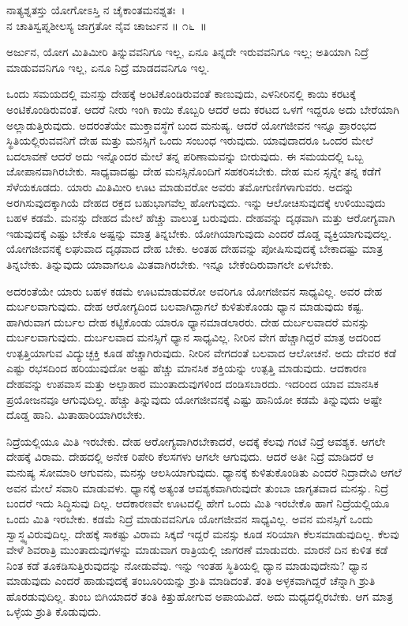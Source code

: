 \begin{shloka}
ನಾತ್ಯಶ್ನತಸ್ತು ಯೋಗೋಽಸ್ತಿ ನ ಚೈಕಾಂತಮನಶ್ನತಃ~।\\ನ ಚಾತಿಸ್ವಪ್ನಶೀಲಸ್ಯ ಜಾಗ್ರತೋ ನೈವ ಚಾರ್ಜುನ \hfill॥ ೧೬~॥
\end{shloka}

\begin{artha}
ಅರ್ಜುನ, ಯೋಗ ಮಿತಿಮೀರಿ ತಿನ್ನುವವನಿಗೂ ಇಲ್ಲ, ಏನೂ ತಿನ್ನದೇ ಇರುವವನಿಗೂ ಇಲ್ಲ; ಅತಿಯಾಗಿ ನಿದ್ರೆ ಮಾಡುವವನಿಗೂ ಇಲ್ಲ, ಏನೂ ನಿದ್ರೆ ಮಾಡದವನಿಗೂ ಇಲ್ಲ.
\end{artha}

ಒಂದು ಸಮಯದಲ್ಲಿ ಮನಸ್ಸು ದೇಹಕ್ಕೆ ಅಂಟಿಕೊಂಡಿರುವಂತೆ ಕಾಣುವುದು, ಎಳನೀರಿನಲ್ಲಿ ಕಾಯಿ ಕರಟಕ್ಕೆ ಅಂಟಿಕೊಂಡಿರುವಂತೆ. ಆದರೆ ನೀರು ಇಂಗಿ ಕಾಯಿ ಕೊಬ್ಬರಿ ಆದರೆ ಅದು ಕರಟದ ಒಳಗೆ ಇದ್ದರೂ ಅದು ಬೇರೆಯಾಗಿ ಅಲ್ಲಾಡುತ್ತಿರುವುದು. ಅದರಂತೆಯೇ ಮುಕ್ತಾವಸ್ಥೆಗೆ ಬಂದ ಮನುಷ್ಯ. ಆದರೆ ಯೋಗಜೀವನ ಇನ್ನೂ ಪ್ರಾರಂಭದ ಸ್ಥಿತಿಯಲ್ಲಿರುವವನಿಗೆ ದೇಹ ಮತ್ತು ಮನಸ್ಸಿಗೆ ಒಂದು ಸಂಬಂಧ ಇರುವುದು. ಯಾವುದಾದರೂ ಒಂದರ ಮೇಲೆ ಬದಲಾವಣೆ ಆದರೆ ಅದು ಇನ್ನೊಂದರ ಮೇಲೆ ತನ್ನ ಪರಿಣಾಮವನ್ನು ಬೀರುವುದು. ಈ ಸಮಯದಲ್ಲಿ ಒಬ್ಬ ಜೋಪಾನವಾಗಿರಬೇಕು. ಸಾಧ್ಯವಾದಷ್ಟು ದೇಹ ಮನಸ್ಸಿನೊಂದಿಗೆ ಸಹಕರಿಸಬೇಕು. ದೇಹ ಮನ ಸ್ಸನ್ನೇ ತನ್ನ ಕಡೆಗೆ ಸೆಳೆಯಕೂಡದು. ಯಾರು ಮಿತಿಮೀರಿ ಊಟ ಮಾಡುವರೋ ಅವರು ತಮೋಗುಣಿಗಳಾಗುವರು. ಅದನ್ನು ಅರಗಿಸುವುದಕ್ಕಾಗಿಯೆ ದೇಹದ ರಕ್ತದ ಬಹುಭಾಗವೆಲ್ಲ ಹೋಗುವುದು. ಇನ್ನು ಆಲೋಚಿಸುವುದಕ್ಕೆ ಉಳಿಯುವುದು ಬಹಳ ಕಡಮೆ. ಮನಸ್ಸು ದೇಹದ ಮೇಲೆ ಹೆಚ್ಚು ವಾಲುತ್ತ ಬರುವುದು. ದೇಹವನ್ನು ದೃಢವಾಗಿ ಮತ್ತು ಆರೋಗ್ಯವಾಗಿ ಇಡುವುದಕ್ಕೆ ಎಷ್ಟು ಬೇಕೊ ಅಷ್ಟನ್ನು ಮಾತ್ರ ತಿನ್ನಬೇಕು. ಯೋಗಿಯಾಗುವುದು ಎಂದರೆ ದೊಡ್ಡ ವ್ಯಕ್ತಿಯಾಗುವುದಲ್ಲ. ಯೋಗಜೀವನಕ್ಕೆ ಲಘುವಾದ ದೃಢವಾದ ದೇಹ ಬೇಕು. ಅಂತಹ ದೇಹವನ್ನು ಪೋಷಿಸುವುದಕ್ಕೆ ಬೇಕಾದಷ್ಟು ಮಾತ್ರ ತಿನ್ನಬೇಕು. ತಿನ್ನುವುದು ಯಾವಾಗಲೂ ಮಿತವಾಗಿರಬೇಕು. ಇನ್ನೂ ಬೇಕೆಂದಿರುವಾಗಲೇ ಏಳಬೇಕು.

ಅದರಂತೆಯೇ ಯಾರು ಬಹಳ ಕಡಮೆ ಊಟಮಾಡುವರೋ ಅವರಿಗೂ ಯೋಗಜೀವನ ಸಾಧ್ಯವಿಲ್ಲ. ಅವರ ದೇಹ ದುರ್ಬಲವಾಗುವುದು. ದೇಹ ಆರೋಗ್ಯದಿಂದ ಬಲವಾಗಿದ್ದಾಗಲೆ ಕುಳಿತುಕೊಂಡು ಧ್ಯಾನ ಮಾಡುವುದು ಕಷ್ಟ. ಹಾಗಿರುವಾಗ ದುರ್ಬಲ ದೇಹ ಕಟ್ಟಿಕೊಂಡು ಯಾರೂ ಧ್ಯಾನಮಾಡಲಾರರು. ದೇಹ ದುರ್ಬಲವಾದರೆ ಮನಸ್ಸು ದುರ್ಬಲವಾಗುವುದು. ದುರ್ಬಲವಾದ ಮನಸ್ಸಿಗೆ ಧ್ಯಾನ ಸಾಧ್ಯವಿಲ್ಲ. ನೀರಿನ ವೇಗ ಹೆಚ್ಚಾಗಿದ್ದರೆ ಮಾತ್ರ ಅದರಿಂದ ಉತ್ಪತ್ತಿಯಾಗುವ ವಿದ್ಯುಚ್ಛಕ್ತಿ ಕೂಡ ಹೆಚ್ಚಾಗಿರುವುದು. ನೀರಿನ ವೇಗದಂತೆ ಬಲವಾದ ಆಲೋಚನೆ. ಅದು ದೇವರ ಕಡೆ ಎಷ್ಟು ರಭಸದಿಂದ ಹರಿಯುವುದೋ ಅಷ್ಟು ಹೆಚ್ಚು ಮಾನಸಿಕ ಶಕ್ತಿಯನ್ನು ಉತ್ಪತ್ತಿ ಮಾಡುವುದು. ಆದಕಾರಣ ದೇಹವನ್ನು ಉಪವಾಸ ಮತ್ತು ಅಲ್ಪಾಹಾರ ಮುಂತಾದುವುಗಳಿಂದ ದಂಡಿಸಬಾರದು. ಇದರಿಂದ ಯಾವ ಮಾನಸಿಕ ಪ್ರಯೋಜನವೂ ಆಗುವುದಿಲ್ಲ. ಹೆಚ್ಚು ತಿನ್ನುವುದು ಯೋಗಜೀವನಕ್ಕೆ ಎಷ್ಟು ಹಾನಿಯೋ ಕಡಮೆ ತಿನ್ನುವುದು ಅಷ್ಟೇ ದೊಡ್ಡ ಹಾನಿ. ಮಿತಾಹಾರಿಯಾಗಿರಬೇಕು.

ನಿದ್ರೆಯಲ್ಲಿಯೂ ಮಿತಿ ಇರಬೇಕು. ದೇಹ ಆರೋಗ್ಯವಾಗಿರಬೇಕಾದರೆ, ಅದಕ್ಕೆ ಕೆಲವು ಗಂಟೆ ನಿದ್ರೆ ಆವಶ್ಯಕ. ಆಗಲೇ ದೇಹಕ್ಕೆ ವಿರಾಮ. ದೇಹದಲ್ಲಿ ಅನೇಕ ರಿಪೇರಿ ಕೆಲಸಗಳು ಆಗಲೇ ಆಗುವುದು. ಆದರೆ ಅತೀ ನಿದ್ರೆ ಮಾಡಿದರೆ ಆ ಮನುಷ್ಯ ಸೋಮಾರಿ ಆಗುವನು, ಮನಸ್ಸು ಆಲಸಿಯಾಗುವುದು. ಧ್ಯಾನಕ್ಕೆ ಕುಳಿತುಕೊಂಡಿತು ಎಂದರೆ ನಿದ್ರಾದೇವಿ ಆಗಲೆ ಅವನ ಮೇಲೆ ಸವಾರಿ ಮಾಡುವಳು. ಧ್ಯಾನಕ್ಕೆ ಅತ್ಯಂತ ಆವಶ್ಯಕವಾಗಿರುವುದೇ ತುಂಬಾ ಜಾಗೃತವಾದ ಮನಸ್ಸು. ನಿದ್ರೆ ಬಂದರೆ ಇದು ಸಿದ್ಧಿಸುವು ದಿಲ್ಲ. ಆದಕಾರಣವೇ ಊಟದಲ್ಲಿ ಹೇಗೆ ಒಂದು ಮಿತಿ ಇರಬೇಕೊ ಹಾಗೆ ನಿದ್ರೆಯಲ್ಲಿಯೂ ಒಂದು ಮಿತಿ ಇರಬೇಕು. ಕಡಮೆ ನಿದ್ರೆ ಮಾಡುವವನಿಗೂ ಯೋಗಜೀವನ ಸಾಧ್ಯವಿಲ್ಲ. ಅವನ ಮನಸ್ಸಿಗೆ ಒಂದು ಸ್ವಾಸ್ಥ್ಯವಿರುವುದಿಲ್ಲ. ದೇಹಕ್ಕೆ ಸಾಕಷ್ಟು ವಿರಾಮ ಸಿಕ್ಕದೆ ಇದ್ದರೆ ಮನಸ್ಸು ಕೂಡ ಸರಿಯಾಗಿ ಕೆಲಸಮಾಡುವುದಿಲ್ಲ. ಕೆಲವು ವೇಳೆ ಶಿವರಾತ್ರಿ ಮುಂತಾದುವುಗಳನ್ನು ಮಾಡುವಾಗ ರಾತ್ರಿಯಲ್ಲಿ ಜಾಗರಣೆ ಮಾಡುವರು. ಮಾರನೆ ದಿನ ಕುಳಿತ ಕಡೆ ನಿಂತ ಕಡೆ ತೂಕಡಿಸುತ್ತಿರುವುದನ್ನು ನೋಡುವೆವು. ಇನ್ನು ಇಂತಹ ಸ್ಥಿತಿಯಲ್ಲಿ ಧ್ಯಾನ ಮಾಡುವುದೇನು? ಧ್ಯಾನ ಮಾಡುವುದು ಎಂದರೆ ಹಾಡುವುದಕ್ಕೆ ತಂಬೂರಿಯನ್ನು ಶ್ರುತಿ ಮಾಡಿದಂತೆ. ತಂತಿ ಅಳ್ಳಕವಾಗಿದ್ದರೆ ಚೆನ್ನಾಗಿ ಶ್ರುತಿ ಹೊರಡುವುದಿಲ್ಲ. ತುಂಬ ಬಿಗಿಯಾದರೆ ತಂತಿ ಕಿತ್ತುಹೋಗುವ ಅಪಾಯವಿದೆ. ಅದು ಮಧ್ಯದಲ್ಲಿರಬೇಕು. ಆಗ ಮಾತ್ರ ಒಳ್ಳೆಯ ಶ್ರುತಿ ಕೊಡುವುದು.

